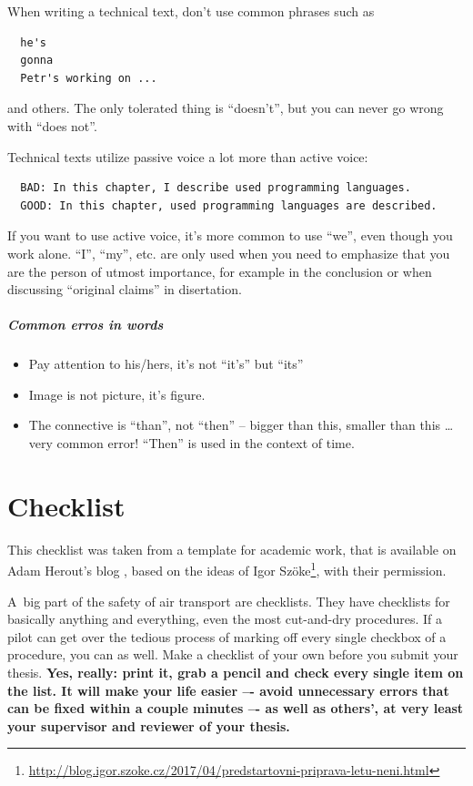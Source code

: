 When writing a technical text, don't use common phrases such as
\begin{verbatim}
  he's
  gonna
  Petr's working on ...
\end{verbatim}
\noindent and others. The only tolerated thing is ``doesn't'', but you can never go wrong with ``does not''.

\begin{samepage}
\noindent Technical texts utilize passive voice a lot more than active voice: 
\begin{verbatim}
  BAD: In this chapter, I describe used programming languages. 
  GOOD: In this chapter, used programming languages are described.
\end{verbatim}
\end{samepage}

If you want to use active voice, it's more common to use ``we'', even though you work alone. ``I'', ``my'', etc. are only used when you need to emphasize that you are the person of utmost importance, for example in the conclusion or when discussing ``original claims'' in disertation.


\paragraph{Common erros in words}

\begin{itemize}
  \item{Pay attention to his/hers, it's not ``it's'' but ``its''}
  \item{Image is not picture, it's figure.}
  \item{The connective is ``than'', not ``then'' -- bigger than this, smaller than this \ldots very common error! ``Then'' is used in the context of time.}
\end{itemize}


\chapter{Checklist}
\label{checklist}
This checklist was taken from a template for academic work, that is available on Adam Herout's blog \cite{Herout}, based on the ideas of Igor Szöke\footnote{\url{http://blog.igor.szoke.cz/2017/04/predstartovni-priprava-letu-neni.html}}, with their permission.

A~big part of the safety of air transport are checklists. They have checklists for basically anything and everything, even the most cut-and-dry procedures. If a pilot can get over the tedious process of marking off every single checkbox of a procedure, you can as well. Make a checklist of your own before you submit your thesis. \bf Yes, really: \rm print it, grab a pencil and check every single item on the list. It will make your life easier –- avoid unnecessary errors that can be fixed within a couple minutes –- as well as others', at very least your supervisor and reviewer of your thesis.

